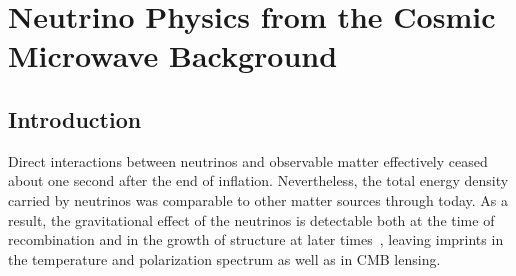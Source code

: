  
\chapter{Neutrino Physics from the Cosmic Microwave Background}
\renewcommand*\thesection{\arabic{section}}

\def\beq{\begin{equation}}
\def\eeq{\end{equation}}

\def\bea{\begin{eqnarray}}
\def\eea{\end{eqnarray}}

\def\Neff{N_{\rm eff}}
\def\Nf{N_{\rm eff}}
\newcommand{\nucl}[3]{ \ensuremath{ \phantom{\ensuremath{^{#1}_{#2}}} \llap{\ensuremath{^{#1}}} \llap{\ensuremath{_{\rule{0pt}{.75em}#2}}} \mbox{#3} } }


\def\gtrsim{\raise-.75ex\hbox{$\buildrel>\over\sim$}}

\section{Introduction}

Direct interactions between neutrinos and observable matter effectively ceased about one second after the end of inflation.  Nevertheless, the total energy density carried by neutrinos was comparable to other matter sources through today.  As a result, the gravitational effect of the neutrinos is detectable both at the time of recombination and in the growth of structure at later times~\cite{Abazajian:2013oma}, leaving imprints in the temperature and polarization spectrum as well as in CMB lensing.

